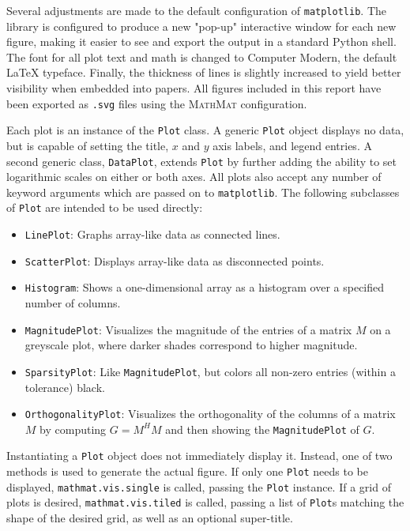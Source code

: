 \documentclass[12pt,a4paper]{article}
\newcommand{\mathmat}{\textsc{MathMat} }
\newcommand{\ct}[1]{\texttt{#1}}
\begin{document}
Several adjustments are made to the default configuration of \ct{matplotlib}. The library is configured to produce a new "pop-up" interactive window for each new figure, making it easier to see and export the output in a standard Python shell. The font for all plot text and math is changed to Computer Modern, the default \LaTeX \: typeface. Finally, the thickness of lines is slightly increased to yield better visibility when embedded into papers. All figures included in this report have been exported as \ct{.svg} files using the \mathmat configuration.

Each plot is an instance of the \ct{Plot} class. A generic \ct{Plot} object displays no data, but is capable of setting the title, $x$ and $y$ axis labels, and legend entries. A second generic class, \ct{DataPlot}, extends \ct{Plot} by further adding the ability to set logarithmic scales on either or both axes. All plots also accept any number of keyword arguments which are passed on to \ct{matplotlib}. The following subclasses of \ct{Plot} are intended to be used directly:
\begin{itemize}
    \item \ct{LinePlot}: Graphs array-like data as connected lines.
    \item \ct{ScatterPlot}: Displays array-like data as disconnected points.
    \item \ct{Histogram}: Shows a one-dimensional array as a histogram over a specified number of columns.
    \item \ct{MagnitudePlot}: Visualizes the magnitude of the entries of a matrix $M$ on a greyscale plot, where darker shades correspond to higher magnitude.
    \item \ct{SparsityPlot}: Like \ct{MagnitudePlot}, but colors all non-zero entries (within a tolerance) black.
    \item \ct{OrthogonalityPlot}: Visualizes the orthogonality of the columns of a matrix $M$ by computing $G = M^H M$ and then showing the \ct{MagnitudePlot} of $G$.
\end{itemize}

Instantiating a \ct{Plot} object does not immediately display it. Instead, one of two methods is used to generate the actual figure. If only one \ct{Plot} needs to be displayed, \ct{mathmat.vis.single} is called, passing the \ct{Plot} instance. If a grid of plots is desired, \ct{mathmat.vis.tiled} is called, passing a list of \ct{Plot}s matching the shape of the desired grid, as well as an optional super-title.
\end{document}
